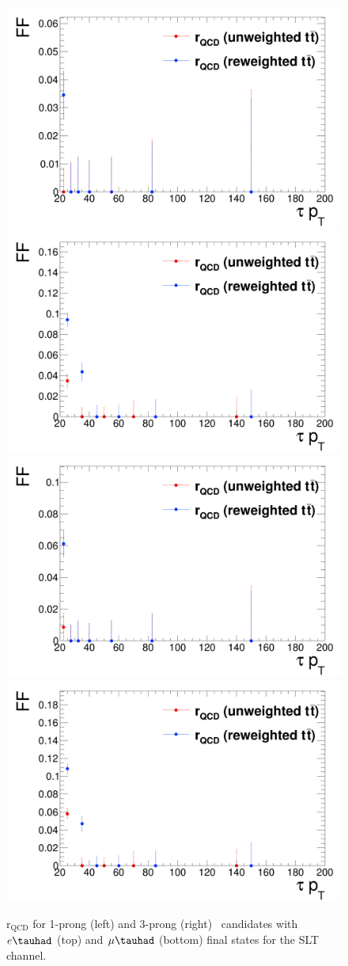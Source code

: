 \begin{figure}[htbp]
\centering
\includegraphics[width=.48\textwidth]{DiHiggs/plots/FF_CRs/SLTElecrQCD1p.png}
\includegraphics[width=.48\textwidth]{DiHiggs/plots/FF_CRs/SLTElecrQCD3p.png} \\
\includegraphics[width=.48\textwidth]{DiHiggs/plots/FF_CRs/SLTMuonrQCD1p.png}
\includegraphics[width=.48\textwidth]{DiHiggs/plots/FF_CRs/SLTMuonrQCD3p.png}\\
\caption{$\mathrm{r}_{\mathrm{QCD}}$ for 1-prong (left) 
and 3-prong (right) \tauhad\ candidates with $e\tauhad$ 
 (top) and $\mu\tauhad$ (bottom) final states
for the SLT channel.}
\label{fig:SLT_rQCD}
\end{figure}

